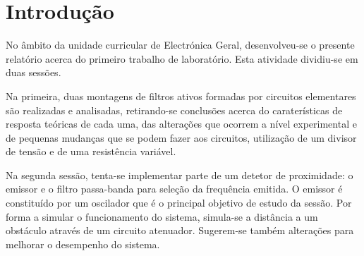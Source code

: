 \section{Introdução}

No âmbito da unidade curricular de Electrónica Geral, desenvolveu-se o presente relatório acerca do primeiro trabalho de laboratório. Esta atividade dividiu-se em duas sessões.

Na primeira, duas montagens de filtros ativos formadas por circuitos elementares são realizadas e analisadas, retirando-se conclusões acerca do caraterísticas de resposta teóricas de cada uma, das alterações que ocorrem a nível experimental e de pequenas mudanças que se podem fazer aos circuitos, utilização de um divisor de tensão e de uma resistência variável.

Na segunda sessão, tenta-se implementar parte de um detetor de proximidade: o emissor e o filtro passa-banda para seleção da frequência emitida. O emissor é constituído por um oscilador que é o principal objetivo de estudo da sessão. Por forma a simular o funcionamento do sistema, simula-se a distância a um obstáculo através de um circuito atenuador. Sugerem-se também alterações para melhorar o desempenho do sistema.

\clearpage